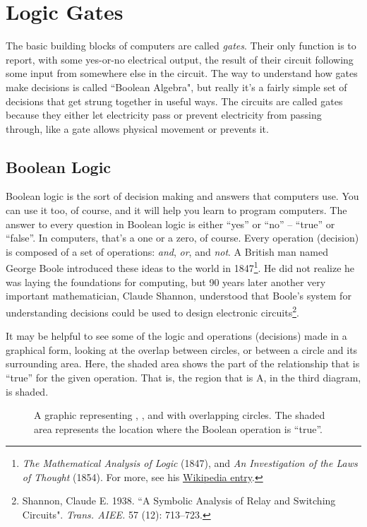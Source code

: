 \section{Logic Gates}

The basic building blocks of computers are called \emph{gates}. Their only function is to report, with some yes-or-no electrical output, the result of their circuit following some input from somewhere else in the circuit. The way to understand how gates make decisions is called ``Boolean Algebra", but really it's a fairly simple set of decisions that get strung together in useful ways. The circuits are called gates because they either let electricity pass or prevent electricity from passing through, like a gate allows physical movement or prevents it.

\subsection*{Boolean Logic}

Boolean logic is the sort of decision making and answers that computers use. You can use it too, of course, and it will help you learn to program computers. The answer to every question in Boolean logic is either ``yes'' or ``no'' -- ``true'' or ``false''. In computers, that's a one or a zero, of course.   Every operation (decision) is composed of a set of operations: \emph{and}, \emph{or}, and \emph{not}. A British man named George Boole introduced these ideas to the world in 1847\footnote{
\emph{The Mathematical Analysis of Logic} (1847), and \emph{An Investigation of the Laws of Thought} (1854). For more, see his {\color{webblue}\href{https://en.wikipedia.org/wiki/George_Boole}{Wikipedia entry}}.}. He did not realize he was laying the foundations for computing, but 90 years later another very important mathematician, Claude Shannon, understood that Boole's system for understanding decisions could be used to design electronic circuits\footnote{Shannon, Claude E. 1938. ``A Symbolic Analysis of Relay and Switching Circuits". \emph{Trans. AIEE.} 57 (12): 713--723.}.

It may be helpful to see some of the logic and operations (decisions) made in a graphical form, looking at the overlap between circles, or between a circle and its surrounding area. Here, the shaded area shows the part of the relationship that is ``true'' for the given operation. That is, the region that is {} A, in the third diagram, is shaded.

\begin{figure}[!ht]
\begin{center}
\begin{minipage}{6in}

\caption{A graphic representing {}, {}, and {} with overlapping circles. The shaded area represents the location where the Boolean operation is ``true''.}
\label{fig:vennlogic}
\end{minipage}
\end{center}
\end{figure}



